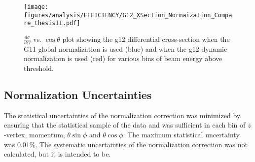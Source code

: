 \begin{figure}[h!]\begin{center}
\texttt{[image: \\figures/analysis/EFFICIENCY/G12\_XSection\_Normaization\_Compare\_thesisII.pdf]}
\caption[$\frac{d \sigma}{d \Omega}$ vs. $\cos \theta$ plot showing the g12 \pizT differential cross-section when the G11 global normalization is used (blue) and when the g12 dynamic normalization is used (red) for various bins of beam energy above  threshold]{\label{fig:toteff_compareII} $\frac{d \sigma}{d \Omega}$ vs. $\cos \theta$ plot showing the g12 \pizT differential cross-section when the G11 global normalization is used (blue) and when the g12 dynamic normalization is used (red) for various bins of beam energy above  threshold.}
\end{center}\end{figure}

\FloatBarrier

\subsection{Normalization Uncertainties}
The statistical uncertainties of the normalization correction was minimized by ensuring that the statistical sample of the data and  was sufficient in each bin of $z$-vertex, momentum, $\theta \sin\phi$ and $\theta \cos\phi$. The maximum statistical uncertainty was 0.01\%. The systematic uncertainties of the normalization correction was not calculated, but it is intended to be.